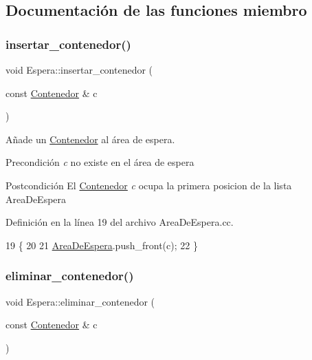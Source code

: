 \subsection{Documentación de las funciones miembro}
\mbox{\label{class_espera_a7154136eb8addbeebe5cc1406d6400c0}} 
\subsubsection{\texorpdfstring{insertar\+\_\+contenedor()}{insertar\_contenedor()}}
{\footnotesize\ttfamily void Espera\+::insertar\+\_\+contenedor (\begin{DoxyParamCaption}\item[{const \hyperlink{class_contenedor}{Contenedor} \&}]{c }\end{DoxyParamCaption})}



Añade un \hyperlink{class_contenedor}{Contenedor} al área de espera. 

\begin{DoxyPrecond}{Precondición}
{\itshape c} no existe en el área de espera 
\end{DoxyPrecond}
\begin{DoxyPostcond}{Postcondición}
El \hyperlink{class_contenedor}{Contenedor} {\itshape c} ocupa la primera posicion de la lista Area\+De\+Espera 
\end{DoxyPostcond}


Definición en la línea 19 del archivo Area\+De\+Espera.\+cc.


\begin{DoxyCode}
19                                                      \{
20     
21     \hyperlink{class_espera_adafca5e22c5bc21e517b363144fc6b18}{AreaDeEspera}.push\_front(c);
22 \}
\end{DoxyCode}
\mbox{\label{class_espera_a925d1944461d0e9bedef4d788283b98f}} 
\subsubsection{\texorpdfstring{eliminar\+\_\+contenedor()}{eliminar\_contenedor()}}
{\footnotesize\ttfamily void Espera\+::eliminar\+\_\+contenedor (\begin{DoxyParamCaption}\item[{const \hyperlink{class_contenedor}{Contenedor} \&}]{c }\end{DoxyParamCaption})}



